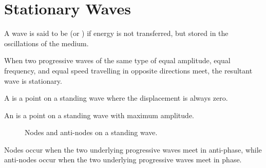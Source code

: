 \section{Stationary Waves}

\begin{definition}
    A wave is said to be  (or ) if energy is not transferred, but stored in the oscillations of the medium.
\end{definition}

When two progressive waves of the same type of equal amplitude, equal frequency, and equal speed travelling in opposite directions meet, the resultant wave is stationary.

\begin{definition}
    A  is a point on a standing wave where the displacement is always zero.
\end{definition}

\begin{definition}
    An  is a point on a standing wave with maximum amplitude.
\end{definition}

\begin{figure}[H]
    \centering
    \caption{Nodes and anti-nodes on a standing wave.}
\end{figure}

Nodes occur when the two underlying progressive waves meet in anti-phase, while anti-nodes occur when the two underlying progressive waves meet in phase.

